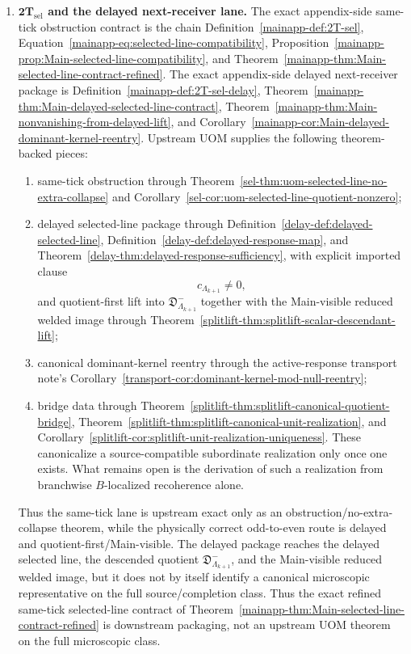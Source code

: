 \documentclass[11pt]{article}
\theoremstyle{definition}
\theoremstyle{plain}
\theoremstyle{remark}
\begin{document}
\begin{enumerate}[leftmargin=2em]
\item \textbf{\(\mathbf{2T}_{\mathrm{sel}}\) and the delayed next-receiver lane.}
  The exact appendix-side same-tick obstruction contract is the chain
  Definition~\ref*{mainapp-def:2T-sel},
  Equation~\ref*{mainapp-eq:selected-line-compatibility},
  Proposition~\ref*{mainapp-prop:Main-selected-line-compatibility}, and
  Theorem~\ref*{mainapp-thm:Main-selected-line-contract-refined}.
  The exact appendix-side delayed next-receiver package is
  Definition~\ref*{mainapp-def:2T-sel-delay},
  Theorem~\ref*{mainapp-thm:Main-delayed-selected-line-contract},
  Theorem~\ref*{mainapp-thm:Main-nonvanishing-from-delayed-lift}, and
  Corollary~\ref*{mainapp-cor:Main-delayed-dominant-kernel-reentry}.
  Upstream UOM supplies the following theorem-backed pieces:
  \begin{enumerate}[label=\textnormal{(\alph*)},leftmargin=2em]
  \item same-tick obstruction through
    Theorem~\ref*{sel-thm:uom-selected-line-no-extra-collapse} and
    Corollary~\ref*{sel-cor:uom-selected-line-quotient-nonzero};
  \item delayed selected-line package through
    Definition~\ref*{delay-def:delayed-selected-line},
    Definition~\ref*{delay-def:delayed-response-map}, and
    Theorem~\ref*{delay-thm:delayed-response-sufficiency}, with explicit imported clause
    \[
    c_{\Lambda_{k+1}}\neq 0,
    \]
    and quotient-first lift into \(\mathfrak D^-_{\Lambda_{k+1}}\) together with the Main-visible
    reduced welded image through
    Theorem~\ref*{splitlift-thm:splitlift-scalar-descendant-lift};
  \item canonical dominant-kernel reentry through the active-response transport note's
    Corollary~\ref*{transport-cor:dominant-kernel-mod-null-reentry};
  \item bridge data through
    Theorem~\ref*{splitlift-thm:splitlift-canonical-quotient-bridge},
    Theorem~\ref*{splitlift-thm:splitlift-canonical-unit-realization}, and
    Corollary~\ref*{splitlift-cor:splitlift-unit-realization-uniqueness}.
    These canonicalize a source-compatible subordinate realization only once one exists.
    What remains open is the derivation of such a realization from branchwise
    \(B\)-localized recoherence alone.
  \end{enumerate}
  Thus the same-tick lane is upstream exact only as an obstruction/no-extra-collapse theorem, while
  the physically correct odd-to-even route is delayed and quotient-first/Main-visible.
  The delayed package reaches the delayed selected line, the descended quotient
  \(\mathfrak D^-_{\Lambda_{k+1}}\), and the Main-visible reduced welded image, but it does
  not by itself identify a canonical microscopic representative on the full source/completion
  class.
  Thus the exact refined same-tick selected-line contract of
  Theorem~\ref*{mainapp-thm:Main-selected-line-contract-refined}
  is downstream packaging, not an upstream UOM theorem on the full microscopic class.


\end{enumerate}
\end{document}
